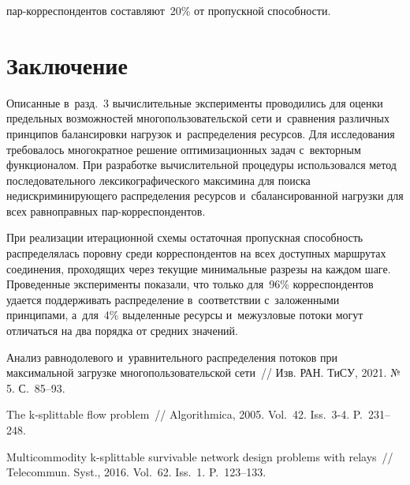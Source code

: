 \begin{multicols}{2}
\pagebreak

\noindent
 пар-корреспондентов 
составляют~20\% от пропускной способности. 

\vspace*{-12pt}

\section{Заключение}

\vspace*{-2pt}

Описанные в~разд.~3 вычислительные эксперименты проводились для оценки 
предельных возможностей многопользовательской сети и~сравнения различных 
принципов балансировки нагрузок и~распределения ресурсов. Для исследования 
требовалось многократное решение оптимизационных задач с~векторным 
функционалом. При разработке вычислительной процедуры использовался метод 
последовательного  лексикографического максимина для поиска  
недискриминирующего  распределения  ресурсов  и~сбалансированной  нагрузки  
для  всех равноправных  пар-корреспондентов.

При реализации итерационной схемы  остаточная пропускная способность 
распределялась поровну среди  корреспондентов на всех доступных маршрутах 
соединения, проходящих через текущие  минимальные  разрезы на каждом шаге. 
Проведенные эксперименты показали, что только для~96\% корреспондентов 
удается поддерживать распределение в~соответствии 
с~заложенными принципами, а~для~4\%  выделенные ресурсы  и~межузловые потоки 
могут отличаться на два порядка от средних  значений.  

{\small\frenchspacing
 {%
 \begin{thebibliography}{9}
  
 Анализ равнодолевого и~уравнительного  
распределения потоков при максимальной загрузке многопользовательской сети~// 
Изв. РАН. ТиСУ, 2021. №\,5. С.~85--93.



  The k-splittable flow problem~// 
Algorithmica, 2005. Vol.~42. Iss.~3-4. P.~231--248.

  Multicommodity k-splittable survivable 
network design problems with relays~// Telecommun. Syst., 2016. Vol.~62. 
Iss.~1. P.~123--133.


\end{thebibliography}}}
\end{multicols}
